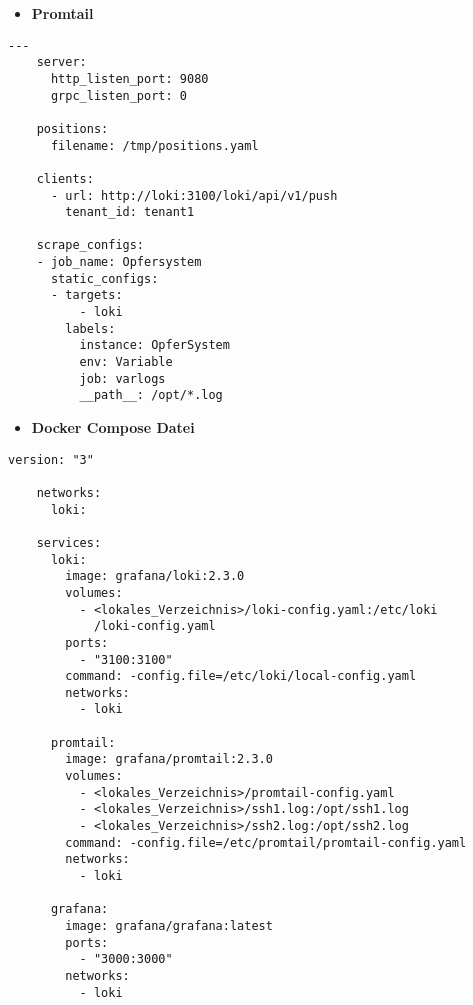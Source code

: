 \begin{itemize}[noitemsep]
    \item \textbf{Promtail} 
\end{itemize}

{
\begin{Verbatim}[frame=single]
    ---
    server:
      http_listen_port: 9080
      grpc_listen_port: 0
    
    positions:
      filename: /tmp/positions.yaml
    
    clients:
      - url: http://loki:3100/loki/api/v1/push
        tenant_id: tenant1
    
    scrape_configs:
    - job_name: Opfersystem
      static_configs:
      - targets:
          - loki
        labels:
          instance: OpferSystem
          env: Variable
          job: varlogs
          __path__: /opt/*.log
\end{Verbatim}
}

\newpage
\begin{itemize}[noitemsep]
    \item \textbf{Docker Compose Datei} 
\end{itemize}

{
\begin{Verbatim}[frame=single]
    version: "3"

    networks:
      loki:
    
    services:
      loki:
        image: grafana/loki:2.3.0
        volumes:
          - <lokales_Verzeichnis>/loki-config.yaml:/etc/loki
            /loki-config.yaml
        ports:
          - "3100:3100"
        command: -config.file=/etc/loki/local-config.yaml
        networks:
          - loki
    
      promtail:
        image: grafana/promtail:2.3.0
        volumes:
          - <lokales_Verzeichnis>/promtail-config.yaml
          - <lokales_Verzeichnis>/ssh1.log:/opt/ssh1.log
          - <lokales_Verzeichnis>/ssh2.log:/opt/ssh2.log
        command: -config.file=/etc/promtail/promtail-config.yaml
        networks:
          - loki
    
      grafana:
        image: grafana/grafana:latest
        ports:
          - "3000:3000"
        networks:
          - loki
    
\end{Verbatim}
}